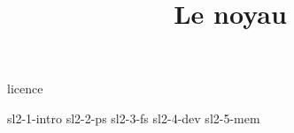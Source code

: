 \documentclass {beamer}
\title {Le noyau}
\begin{document}

 {licence}

 {sl2-1-intro}
 {sl2-2-ps}
 {sl2-3-fs}
 {sl2-4-dev}
 {sl2-5-mem}
\end{document}

